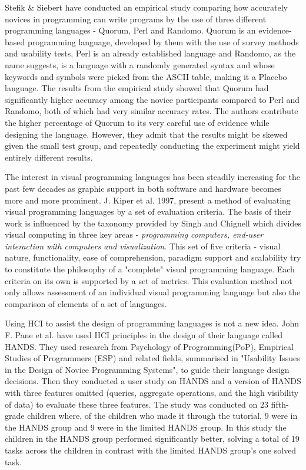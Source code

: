 Stefik \& Siebert \cite{QuorumRandomo} have conducted an empirical study comparing how accurately novices in programming can write programs by the use of three different programming languages - Quorum, Perl and Randomo. Quorum is an evidence-based programming language, developed by them with the use of survey methods and usability tests, Perl is an already established language and Randomo, as the name suggests, is a language with a randomly generated syntax and whose keywords and symbols were picked from the ASCII table, making it a Placebo language. The results from the empirical study showed that Quorum had significantly higher accuracy among the novice participants compared to Perl and Randomo, both of which had very similar accuracy rates. The authors contribute the higher percentage of Quorum to its very careful use of evidence while designing the language. However, they admit that the results might be skewed given the small test group, and repeatedly conducting the experiment might yield entirely different results.

The interest in visual programming languages has been steadily increasing for the past few decades as graphic support in both software and hardware becomes more and more prominent. J. Kiper et al. \cite{VisualLangsEval} 1997, present a method of evaluating visual programming languages by a set of evaluation criteria. The basis of their work is influenced by the taxonomy provided by Singh and Chignell \cite{VisualComputer} which divides visual computing in three key areas - \textit{programming computers, end-user interaction with computers and visualization}. This set of five criteria - visual nature, functionality, ease of comprehension, paradigm support and scalability try to constitute the philosophy of a "complete" visual programming language. Each criteria on its own is supported by a set of metrics. This evaluation method not only allows assessment of an individual visual programming language but also the comparison of elements of a set of languages.

Using HCI to assist the design of programming languages is not a new idea.
John F. Pane et al. \cite{HANDS} have used HCI principles in the design of their language called HANDS.
They used research from Psychology of Programming(PoP), Empirical Studies of Programmers (ESP) and related fields, summarised in "Usability Issues in the Design of Novice Programming Systems"\cite{UsabilityNoviceProgramming}, to guide their language design decisions.
Then they conducted a user study on HANDS and a version of HANDS with three features omitted (queries, aggregate operations, and the high visibility of data) to evaluate these three features.
The study was conducted on 23 fifth-grade children where, of the children who made it through the tutorial, 9 were in the HANDS group and 9 were in the limited HANDS group.
In this study the children in the HANDS group performed significantly better, solving a total of 19 tasks across the children in contrast with the limited HANDS group's one solved task.

